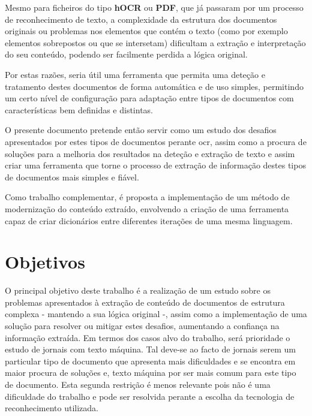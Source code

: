 Mesmo para ficheiros do tipo \textbf{hOCR} ou \textbf{PDF}, que já passaram por um processo de reconhecimento de texto, a complexidade da estrutura dos documentos originais ou problemas nos elementos que contém o texto (como por exemplo elementos sobrepostos ou que se intersetam) dificultam a extração e interpretação do seu conteúdo, podendo ser facilmente perdida a lógica original.

Por estas razões, seria útil uma ferramenta que permita uma deteção e tratamento destes documentos de forma automática e de uso simples, permitindo um certo nível de configuração para adaptação entre tipos de documentos com características bem definidas e distintas. 

O presente documento pretende então servir como um estudo dos desafios apresentados por estes tipos de documentos perante \acrshort{ocr}, assim como a procura de soluções para a melhoria dos resultados na deteção  e extração de texto e assim criar uma ferramenta que torne o processo de extração de informação destes tipos de documentos mais simples e fiável. 

Como trabalho complementar, é proposta a implementação de um método de modernização do conteúdo extraído, envolvendo a criação de uma ferramenta capaz de criar dicionários entre diferentes iterações de uma mesma linguagem. 

\section{Objetivos}
\label{section_objetivos}

O principal objetivo deste trabalho é a realização de um estudo sobre os problemas apresentados à extração de conteúdo de documentos de estrutura complexa - mantendo 
a sua lógica original -, assim como a implementação de uma solução para resolver ou mitigar estes desafios, aumentando a confiança na informação extraída. 
Em termos dos casos alvo do trabalho, será prioridade o estudo de jornais com texto máquina. Tal deve-se ao facto de jornais serem um particular tipo de documento que apresenta mais dificuldades e se encontra em maior procura de soluções e, texto máquina por ser mais comum para este tipo de documento. Esta segunda restrição é menos relevante pois não é uma dificuldade do trabalho e pode ser resolvida perante a escolha da tecnologia de reconhecimento utilizada.

